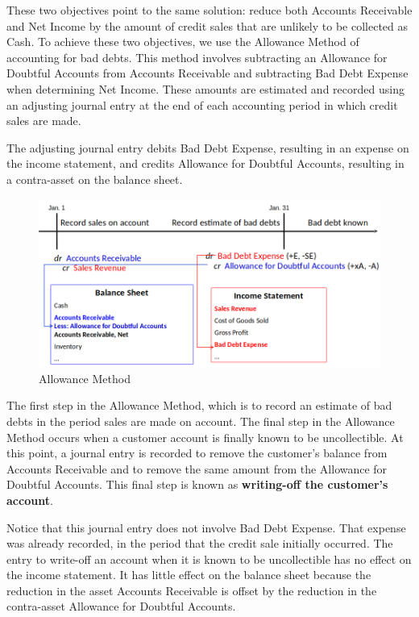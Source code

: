 \documentclass[../main.tex]{subfiles}
\begin{document}
	These two objectives point to the same solution: reduce both Accounts 
	Receivable and Net Income by the amount of credit sales that are unlikely 
	to be collected as Cash. To achieve these two objectives, we use the 
	Allowance Method of accounting for bad debts. This method involves 
	subtracting an Allowance for Doubtful Accounts from Accounts Receivable and 
	subtracting Bad Debt Expense when determining Net Income. These amounts are 
	estimated and recorded using an adjusting journal entry at the end of each 
	accounting period in which credit sales are made. 
	
	The adjusting journal entry debits Bad Debt Expense, resulting in an 
	expense on the income statement, and credits Allowance for Doubtful 
	Accounts, resulting in a contra-asset on the balance sheet. 
	
	\begin{figure}[ht]
		\centering
		\includegraphics[width=\columnwidth]{images/c6/allowance_method.png}
		\caption{Allowance Method}
	\end{figure}
	
	The first step in the Allowance Method, which is to record an estimate of 
	bad debts in the period sales are made on account. The final step in the 
	Allowance Method occurs when a customer account is finally known to be 
	uncollectible. At this point, a journal entry is recorded to remove the 
	customer’s balance from Accounts Receivable and to remove the same amount 
	from the Allowance for Doubtful Accounts. This final step is known as 
	\textbf{writing-off the customer’s account}.
	
	Notice that this journal entry does not involve Bad Debt Expense. That 
	expense was already recorded, in the period that the credit sale initially 
	occurred. The entry to write-off an account when it is known to be 
	uncollectible has no effect on the income statement. It has little effect 
	on the balance sheet because the reduction in the asset Accounts Receivable 
	is offset by the reduction in the contra-asset Allowance for Doubtful 
	Accounts.  
	
\end{document}
